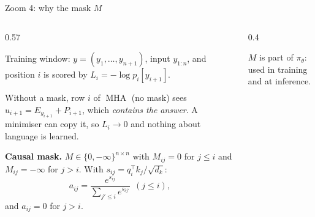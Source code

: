 \documentclass[aspectratio=169,11pt]{beamer}
\newcommand{\crumbbox}{}
\newcommand{\ci}[2]{\ifnum#1=\crumbk\relax{\setlength{\fboxsep}{1.2pt}\colorbox{white}{\color{acc}\bfseries #2}}\else{\color{white!70!acc}#2}\fi}
\newcommand{\crar}{{\color{white!70!acc}$\,\rightarrow\,$}}
\newcommand{\crumbsA}[1]{\gdef\crumbbox{\def\crumbk{#1}\ci{1}{$\AttnB$}\crar\ci{2}{$\MHA_M$}\crar\ci{3}{$\Attn^M_r$}\crar\ci{4}{$S$, softmax}\crar\ci{5}{mask $M$}\crar\ci{6}{$\oplus$, $\LN$}}}
\newcommand{\Attn}{\operatorname{Attn}}
\newcommand{\AttnB}{\operatorname{Attn{.}B}}
\newcommand{\cfix}{\vspace{-\baselineskip}}%
\newcommand{\MHA}{\operatorname{MHA}}
\newcommand{\LN}{\operatorname{LN}}
\begin{document}
\crumbsA{5}
\begin{frame}[t]{Zoom 4: why the mask $M$}
\begin{columns}[T]
\begin{column}{0.57\textwidth}
{\small Training window: $y=(y_1,\dots,y_{n+1})$, input $y_{1:n}$, and position $i$ is scored by $L_i=-\log p_i[y_{i+1}]$.\par\vspace{0.3em}
Without a mask, row $i$ of $\MHA$ (no mask) sees $u_{i+1}=E_{y_{i+1}}+P_{i+1}$, which \emph{contains the answer}. A minimiser can copy it, so $L_i\to0$ and nothing about language is learned.\par}
\begin{bxdef}
\textbf{Causal mask.} $M\in\{0,-\infty\}^{n\times n}$ with $M_{ij}=0$ for $j\le i$ and $M_{ij}=-\infty$ for $j>i$. With $s_{ij}=q_i^\top k_j/\sqrt{d_k}$:
\[
a_{ij}=\frac{e^{s_{ij}}}{\sum_{j'\le i}e^{s_{ij'}}}\ \ (j\le i),
\]
and $a_{ij}=0$ for $j>i$.
\end{bxdef}
\end{column}
\begin{column}{0.4\textwidth}
\cfix
\begin{center}
\end{center}
{\footnotesize $M$ is part of $\pi_\theta$: used in training and at inference.\par}
\end{column}
\end{columns}
\end{frame}
\end{document}
